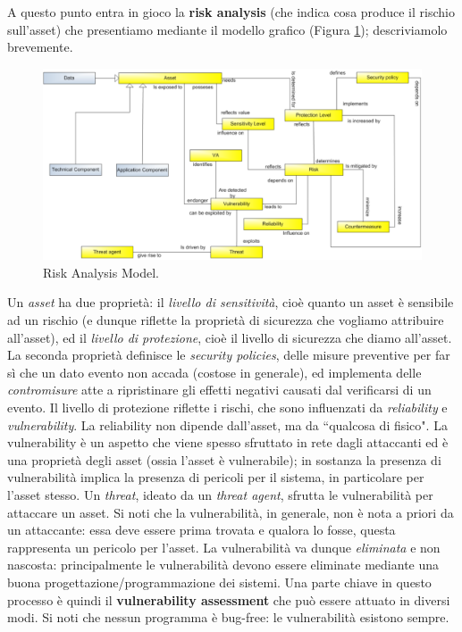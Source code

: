 A questo punto entra in gioco la \textbf{risk analysis} (che indica cosa produce il rischio sull'asset) che presentiamo mediante il modello grafico (Figura \ref{img:risk_analysis_model}); descriviamolo brevemente. 
\begin{figure}[htbp]
	\centering
	\includegraphics[scale = 0.4]{images/risk_analysis_model}
	\caption{Risk Analysis Model.}
	\label{img:risk_analysis_model}
\end{figure}

Un \textit{asset} ha due proprietà: il \textit{livello di sensitività}, cioè quanto un asset è sensibile ad un rischio (e dunque riflette la proprietà di sicurezza che vogliamo attribuire all'asset), ed il \textit{livello di protezione}, cioè il livello di sicurezza che diamo all'asset. La seconda proprietà definisce le \textit{security policies}, delle misure preventive per far sì che un dato evento non accada (costose in generale), ed implementa delle \textit{contromisure} atte a ripristinare gli effetti negativi causati dal verificarsi di un evento. Il livello di protezione riflette i rischi, che sono influenzati da \textit{reliability} e \textit{vulnerability}. La reliability non dipende dall'asset, ma da \textquotedblleft qualcosa di fisico". La vulnerability è un aspetto che viene spesso sfruttato in rete dagli attaccanti ed è una proprietà degli asset (ossia l'asset è vulnerabile); in sostanza la presenza di vulnerabilità implica la presenza di pericoli per il sistema, in particolare per l'asset stesso. Un \textit{threat}, ideato da un \textit{threat agent}, sfrutta le vulnerabilità per attaccare un asset. Si noti che la vulnerabilità, in generale, non è nota a priori da un attaccante: essa deve essere prima trovata e qualora lo fosse, questa rappresenta un pericolo per l'asset. La vulnerabilità va dunque \textit{eliminata} e non nascosta: principalmente le vulnerabilità devono essere eliminate mediante una buona progettazione/programmazione dei sistemi. Una parte chiave in questo processo è quindi il \textbf{vulnerability assessment} che può essere attuato in diversi modi. Si noti che nessun programma è bug-free: le vulnerabilità esistono sempre.


